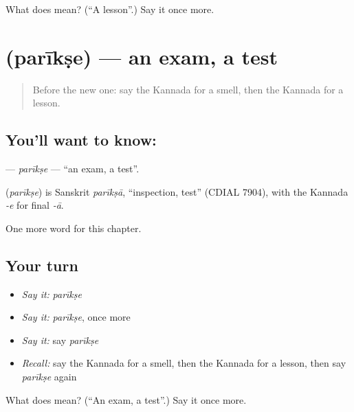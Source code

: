\begin{tcolorbox}[breakable,colback=teal!4,colframe=teal!35!black,title={Before you move on}]
What does  mean? (\textquotedblleft{}A lesson\textquotedblright{}.) Say it once more.
\end{tcolorbox}
\section[\texorpdfstring{\kn{ಪರೀಕ್ಷೆ} (parīkṣe)}{ಪರೀಕ್ಷೆ (parīkṣe)}]{ (parīkṣe) — an exam, a test}

\label{lesson:KA-C304-parikse}



\begin{quote}
Before the new one: say the Kannada for a smell, then the Kannada for a lesson.
\end{quote}

\subsection*{You'll want to know: }
\textbf{} — \emph{parīkṣe} — \textquotedblleft{}an exam, a test\textquotedblright{}.

\begin{cousinweb}
\textbf{} (\emph{parīkṣe}) is Sanskrit \emph{parīkṣā}, \textquotedblleft{}inspection, test\textquotedblright{} (CDIAL 7904), with the Kannada \emph{-e} for final \emph{-ā}.
\end{cousinweb}

\begin{grammarlens}[title={What you've built}]
One more word for this chapter.
\end{grammarlens}

\subsection*{Your turn}
\begin{itemize}
\raggedright
  \item \emph{Say it:} \emph{parīkṣe}
  \item \emph{Say it:} \emph{parīkṣe}, once more
  \item \emph{Say it:} say \emph{parīkṣe}
  \item \emph{Recall:} say the Kannada for a smell, then the Kannada for a lesson, then say \emph{parīkṣe} again
\end{itemize}

\begin{tcolorbox}[breakable,colback=teal!4,colframe=teal!35!black,title={Before you move on}]
What does  mean? (\textquotedblleft{}An exam, a test\textquotedblright{}.) Say it once more.
\end{tcolorbox}
